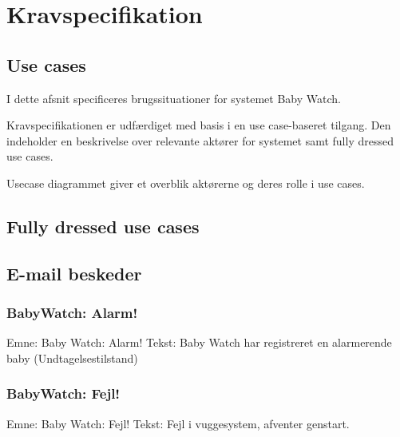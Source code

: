 \chapter{Kravspecifikation}


\newpage
\section{Use cases}

I dette afsnit specificeres brugssituationer for systemet Baby Watch.

Kravspecifikationen er udfærdiget med basis i en use case-baseret tilgang. Den indeholder en beskrivelse over relevante aktører for systemet samt fully dressed use cases.


Usecase diagrammet giver et overblik aktørerne og deres rolle i use cases.


\newpage
\section{Fully dressed use cases}

\newpage

\newpage

\newpage




\section{E-mail beskeder}

\subsection*{BabyWatch: Alarm!}

Emne: Baby Watch: Alarm! \newline
Tekst: Baby Watch har registreret en alarmerende baby (Undtagelsestilstand)

\subsection*{BabyWatch: Fejl!}

Emne: Baby Watch: Fejl! \newline
Tekst: Fejl i vuggesystem, afventer genstart.



